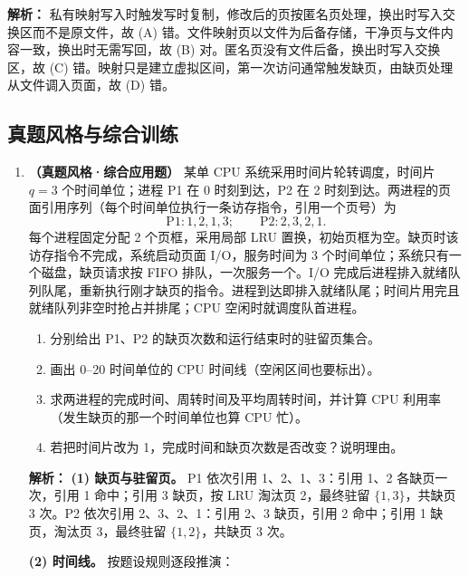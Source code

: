 \begin{enumerate}
\ifshowsolutions\par\noindent\textbf{解析：} 私有映射写入时触发写时复制，修改后的页按匿名页处理，换出时写入交换区而不是原文件，故 (A) 错。文件映射页以文件为后备存储，干净页与文件内容一致，换出时无需写回，故 (B) 对。匿名页没有文件后备，换出时写入交换区，故 (C) 错。映射只是建立虚拟区间，第一次访问通常触发缺页，由缺页处理从文件调入页面，故 (D) 错。\else \answerarea \fi

\end{enumerate}

\subsection{真题风格与综合训练}

\begin{enumerate}[resume]

\item \textbf{（真题风格·综合应用题）} 某单 CPU 系统采用时间片轮转调度，时间片 $q=3$ 个时间单位；进程 P1 在 0 时刻到达，P2 在 2 时刻到达。两进程的页面引用序列（每个时间单位执行一条访存指令，引用一个页号）为
\[
\text{P1}:1,2,1,3;\qquad \text{P2}:2,3,2,1.
\]
每个进程固定分配 2 个页框，采用局部 LRU 置换，初始页框为空。缺页时该访存指令不完成，系统启动页面 I/O，服务时间为 3 个时间单位；系统只有一个磁盘，缺页请求按 FIFO 排队，一次服务一个。I/O 完成后进程排入就绪队列队尾，重新执行刚才缺页的指令。进程到达即排入就绪队尾；时间片用完且就绪队列非空时抢占并排尾；CPU 空闲时就调度队首进程。

\begin{enumerate}
\item[(1)] 分别给出 P1、P2 的缺页次数和运行结束时的驻留页集合。
\item[(2)] 画出 0--20 时间单位的 CPU 时间线（空闲区间也要标出）。
\item[(3)] 求两进程的完成时间、周转时间及平均周转时间，并计算 CPU 利用率（发生缺页的那一个时间单位也算 CPU 忙）。
\item[(4)] 若把时间片改为 1，完成时间和缺页次数是否改变？说明理由。
\end{enumerate}

\ifshowsolutions\par\noindent\textbf{解析：}
\textbf{(1) 缺页与驻留页。} P1 依次引用 1、2、1、3：引用 1、2 各缺页一次，引用 1 命中；引用 3 缺页，按 LRU 淘汰页 2，最终驻留 $\{1,3\}$，共缺页 3 次。P2 依次引用 2、3、2、1：引用 2、3 缺页，引用 2 命中；引用 1 缺页，淘汰页 3，最终驻留 $\{1,2\}$，共缺页 3 次。

\textbf{(2) 时间线。} 按题设规则逐段推演：


\end{enumerate}
